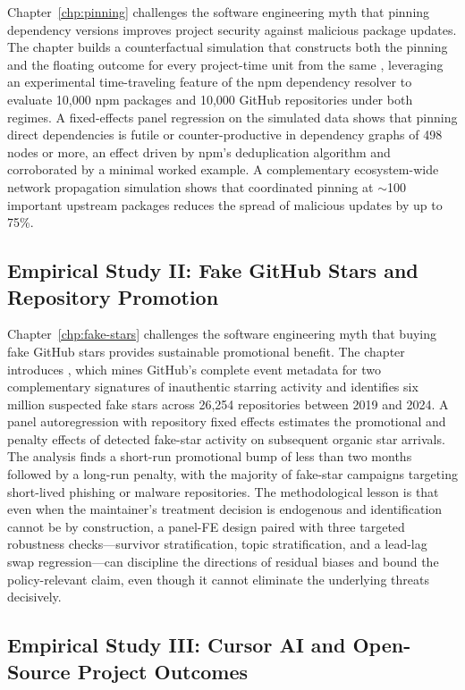 Chapter~\ref{chp:pinning} challenges the software engineering myth that pinning dependency versions improves project security against malicious package updates.
The chapter builds a counterfactual simulation that constructs both the pinning and the floating outcome for every project-time unit from the same , leveraging an experimental time-traveling feature of the npm dependency resolver to evaluate 10{,}000 npm packages and 10{,}000 GitHub repositories under both regimes.
A fixed-effects panel regression on the simulated data shows that pinning direct dependencies is futile or counter-productive in dependency graphs of 498 nodes or more, an effect driven by npm's deduplication algorithm and corroborated by a minimal worked example.
A complementary ecosystem-wide network propagation simulation shows that coordinated pinning at $\sim$100 important upstream packages reduces the spread of malicious updates by up to 75\%.

\subsection{Empirical Study II: Fake GitHub Stars and Repository Promotion}

Chapter~\ref{chp:fake-stars} challenges the software engineering myth that buying fake GitHub stars provides sustainable promotional benefit.
The chapter introduces \SystemName, which mines GitHub's complete event metadata for two complementary signatures of inauthentic starring activity and identifies six million suspected fake stars across 26{,}254 repositories between 2019 and 2024.
A panel autoregression with repository fixed effects estimates the promotional and penalty effects of detected fake-star activity on subsequent organic star arrivals.
The analysis finds a short-run promotional bump of less than two months followed by a long-run penalty, with the majority of fake-star campaigns targeting short-lived phishing or malware repositories.
The methodological lesson is that even when the maintainer's treatment decision is endogenous and identification cannot be by construction, a panel-FE design paired with three targeted robustness checks---survivor stratification, topic stratification, and a lead-lag swap regression---can discipline the directions of residual biases and bound the policy-relevant claim, even though it cannot eliminate the underlying threats decisively.

\subsection{Empirical Study III: Cursor AI and Open-Source Project Outcomes}

